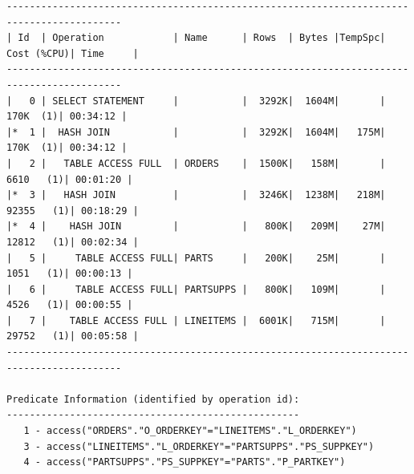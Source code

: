 \documentclass[10pt]{article}
\begin{document}
\begin{lstlisting}[style=queryexecutionplan]
------------------------------------------------------------------------------------------
| Id  | Operation            | Name      | Rows  | Bytes |TempSpc| Cost (%CPU)| Time     |
------------------------------------------------------------------------------------------
|   0 | SELECT STATEMENT     |           |  3292K|  1604M|       |   170K  (1)| 00:34:12 |
|*  1 |  HASH JOIN           |           |  3292K|  1604M|   175M|   170K  (1)| 00:34:12 |
|   2 |   TABLE ACCESS FULL  | ORDERS    |  1500K|   158M|       |  6610   (1)| 00:01:20 |
|*  3 |   HASH JOIN          |           |  3246K|  1238M|   218M| 92355   (1)| 00:18:29 |
|*  4 |    HASH JOIN         |           |   800K|   209M|    27M| 12812   (1)| 00:02:34 |
|   5 |     TABLE ACCESS FULL| PARTS     |   200K|    25M|       |  1051   (1)| 00:00:13 |
|   6 |     TABLE ACCESS FULL| PARTSUPPS |   800K|   109M|       |  4526   (1)| 00:00:55 |
|   7 |    TABLE ACCESS FULL | LINEITEMS |  6001K|   715M|       | 29752   (1)| 00:05:58 |
------------------------------------------------------------------------------------------
 
Predicate Information (identified by operation id):
---------------------------------------------------
   1 - access("ORDERS"."O_ORDERKEY"="LINEITEMS"."L_ORDERKEY")
   3 - access("LINEITEMS"."L_ORDERKEY"="PARTSUPPS"."PS_SUPPKEY")
   4 - access("PARTSUPPS"."PS_SUPPKEY"="PARTS"."P_PARTKEY")
\end{lstlisting}
\end{document}
